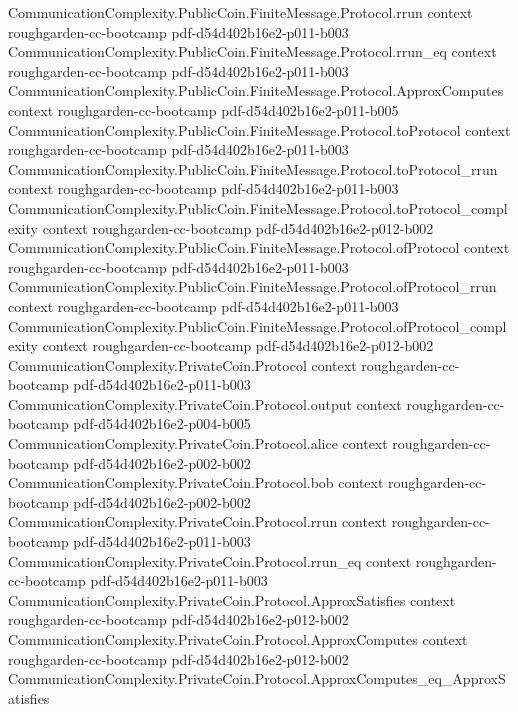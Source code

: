 \begin{theorem}
  {CommunicationComplexity.PublicCoin.FiniteMessage.Protocol.rrun}
  {context}
  {roughgarden-cc-bootcamp}
  {pdf-d54d402b16e2-p011-b003}
\proofstep
  {CommunicationComplexity.PublicCoin.FiniteMessage.Protocol.rrun_eq}
  {context}
  {roughgarden-cc-bootcamp}
  {pdf-d54d402b16e2-p011-b003}
\proofstep
  {CommunicationComplexity.PublicCoin.FiniteMessage.Protocol.ApproxComputes}
  {context}
  {roughgarden-cc-bootcamp}
  {pdf-d54d402b16e2-p011-b005}
\proofstep
  {CommunicationComplexity.PublicCoin.FiniteMessage.Protocol.toProtocol}
  {context}
  {roughgarden-cc-bootcamp}
  {pdf-d54d402b16e2-p011-b003}
\proofstep
  {CommunicationComplexity.PublicCoin.FiniteMessage.Protocol.toProtocol_rrun}
  {context}
  {roughgarden-cc-bootcamp}
  {pdf-d54d402b16e2-p011-b003}
\proofstep
  {CommunicationComplexity.PublicCoin.FiniteMessage.Protocol.toProtocol_complexity}
  {context}
  {roughgarden-cc-bootcamp}
  {pdf-d54d402b16e2-p012-b002}
\proofstep
  {CommunicationComplexity.PublicCoin.FiniteMessage.Protocol.ofProtocol}
  {context}
  {roughgarden-cc-bootcamp}
  {pdf-d54d402b16e2-p011-b003}
\proofstep
  {CommunicationComplexity.PublicCoin.FiniteMessage.Protocol.ofProtocol_rrun}
  {context}
  {roughgarden-cc-bootcamp}
  {pdf-d54d402b16e2-p011-b003}
\proofstep
  {CommunicationComplexity.PublicCoin.FiniteMessage.Protocol.ofProtocol_complexity}
  {context}
  {roughgarden-cc-bootcamp}
  {pdf-d54d402b16e2-p012-b002}
\proofstep
  {CommunicationComplexity.PrivateCoin.Protocol}
  {context}
  {roughgarden-cc-bootcamp}
  {pdf-d54d402b16e2-p011-b003}
\proofstep
  {CommunicationComplexity.PrivateCoin.Protocol.output}
  {context}
  {roughgarden-cc-bootcamp}
  {pdf-d54d402b16e2-p004-b005}
\proofstep
  {CommunicationComplexity.PrivateCoin.Protocol.alice}
  {context}
  {roughgarden-cc-bootcamp}
  {pdf-d54d402b16e2-p002-b002}
\proofstep
  {CommunicationComplexity.PrivateCoin.Protocol.bob}
  {context}
  {roughgarden-cc-bootcamp}
  {pdf-d54d402b16e2-p002-b002}
\proofstep
  {CommunicationComplexity.PrivateCoin.Protocol.rrun}
  {context}
  {roughgarden-cc-bootcamp}
  {pdf-d54d402b16e2-p011-b003}
\proofstep
  {CommunicationComplexity.PrivateCoin.Protocol.rrun_eq}
  {context}
  {roughgarden-cc-bootcamp}
  {pdf-d54d402b16e2-p011-b003}
\proofstep
  {CommunicationComplexity.PrivateCoin.Protocol.ApproxSatisfies}
  {context}
  {roughgarden-cc-bootcamp}
  {pdf-d54d402b16e2-p012-b002}
\proofstep
  {CommunicationComplexity.PrivateCoin.Protocol.ApproxComputes}
  {context}
  {roughgarden-cc-bootcamp}
  {pdf-d54d402b16e2-p012-b002}
\proofstep
  {CommunicationComplexity.PrivateCoin.Protocol.ApproxComputes_eq_ApproxSatisfies}

\end{theorem}

